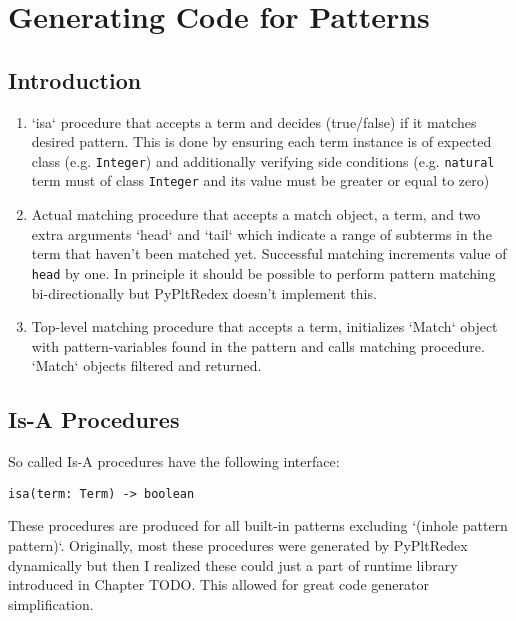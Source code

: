 \section{Generating Code for Patterns}

\subsection{Introduction}

\begin{enumerate}
\item
`isa` procedure that accepts a term and decides (true/false) if it matches desired pattern. This is done by ensuring each term instance is of expected class (e.g. \texttt{Integer}) and additionally verifying side conditions (e.g. \texttt{natural} term must of class \texttt{Integer} and its value must be greater or equal to zero)
\item
Actual matching procedure that accepts a match object, a term, and two extra arguments `head` and `tail` which indicate a range of subterms in the term that haven't been matched yet. Successful matching increments value of \texttt{head} by one. In principle it should be possible to perform pattern matching bi-directionally but PyPltRedex doesn't implement this.
\item
Top-level matching procedure that accepts a term, initializes `Match` object with pattern-variables found in the pattern and calls matching procedure. `Match` objects filtered and returned.
\end{enumerate}


\subsection{Is-A Procedures}

So called Is-A procedures have the following interface:

\begin{lstlisting}
isa(term: Term) -> boolean
\end{lstlisting}

These procedures are produced for all built-in patterns excluding `(inhole pattern pattern)`.  Originally, most these procedures were generated by PyPltRedex dynamically but then I realized these could just a part of runtime library introduced in Chapter TODO. This allowed for great code generator simplification.

